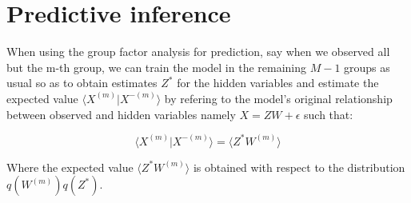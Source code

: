 \documentclass{article}
\begin{document}
\section*{Predictive inference}

When using the group factor analysis for prediction, say when we observed all but the m-th group, we can train the model in the remaining $M-1$ groups as usual so as to obtain estimates $Z^*$ for the hidden variables and estimate the expected value $\langle X^{(m)} | X^{-(m)} \rangle$ by refering to the model's original relationship between observed and hidden variables namely $X = ZW + \epsilon$ such that:

$$\langle X^{(m)} | X^{-(m)} \rangle = \langle Z^* W^{(m)} \rangle$$

Where the expected value $\langle Z^* W^{(m)} \rangle$ is obtained with respect to the distribution $q(W^{(m)})q(Z^*)$.
\end{document}
